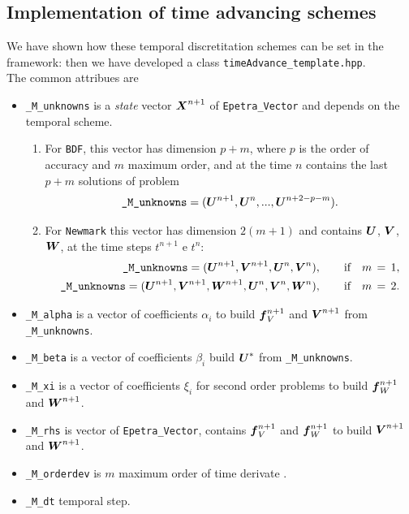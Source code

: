 \documentclass[english,a4paper]{article}
\newcommand{\Xbf}{\text{\mbox{\boldmath $X$}}}
\newcommand{\Ubf}{\text{\mbox{\boldmath $U$}}}
\newcommand{\Abf}{\text{\mbox{\boldmath $W$}}}
\newcommand{\fbf}{\text{\mbox{\boldmath $f$}}}
\newcommand{\Wbf}{\text{\mbox{\boldmath $V$}}}
\begin{document}
\subsection{Implementation of time advancing schemes}
We have shown how these temporal discretitation schemes  can be set in
the framework: then we have developed a class 
\verb"timeAdvance_template.hpp".\\
The common attribues are 
\begin{itemize}
  \item \verb"_M_unknowns"  is a {\sl state} vector $\Xbf^{n+1}$ of \verb"Epetra_Vector" and
    depends on the temporal scheme.
    \begin{enumerate}
    \item[]For \verb"BDF", this vector has dimension 
      $p+m$, where $p$ is the order of accuracy and $m$ maximum order,
      and at the time $n$ contains  the last  $p+m$ solutions of problem
      \begin{displaymath} 
        \verb"_M_unknowns"=(\Ubf^{n+1}, \Ubf^n,..., \Ubf^{n+2-p-m}).
      \end{displaymath}
    \item[] For \verb"Newmark" this vector has dimension $2(m+1)$ and contains $\Ubf$, $\Wbf$, $\Abf$, at the time  steps $t^{n+1}$ e $t^n$:
      \begin{eqnarray*} 
        \verb"_M_unknowns"=(\Ubf^{n+1},\Wbf^{n+1}, \Ubf^n,
        \Wbf^n), \qquad \text{if}\quad m\,=\,1,
        \\
        \verb"_M_unknowns"=(\Ubf^{n+1},\Wbf^{n+1}, \Abf^{n+1}, \Ubf^n,
        \Wbf^n, \Abf^n),\qquad \text{if}\quad m\,=\,2.
      \end{eqnarray*}
    \end{enumerate}
   \item \verb"_M_alpha" is a vector of coefficients $\alpha_i$ to
    build $\fbf_V^{n+1}$ and $\Wbf^{n+1}$ from \verb"_M_unknowns".
  \item \verb"_M_beta" is a vector of coefficients $\beta_i$  build
    $\Ubf^*$  from \verb"_M_unknowns".
  \item \verb"_M_xi" is a vector of coefficients $\xi_i$ for second
    order problems to  build $\fbf_W^{n+1}$ and $\Abf^{n+1}$.
  \item \verb"_M_rhs" is vector of \verb"Epetra_Vector", contains
    $\fbf_V^{n+1}$ and $\fbf_W^{n+1}$ to build $\Wbf^{n+1}$ and $\Abf^{n+1}$.
  \item \verb"_M_orderdev" is  $m$ maximum order of time derivate .
  \item \verb"_M_dt" temporal step.
  \end{itemize}
\end{document}
